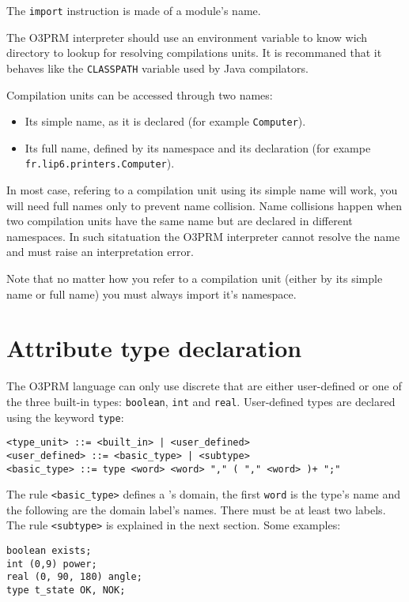 \documentclass[singlespacing,12pt,a4paper]{article}
\begin{document}
The \verb+import+ instruction is made of a module's name.

The O3PRM interpreter should use an environment variable to know wich directory
to lookup for resolving compilations units. It is recommaned that it behaves
like the \verb+CLASSPATH+ variable used by Java compilators.

Compilation units can be accessed through two names:
\begin{itemize}
\item Its simple name, as it is declared (for example \verb+Computer+).
\item Its full name, defined by its namespace and its declaration (for exampe
\verb+fr.lip6.printers.Computer+).
\end{itemize}
In most case, refering to a compilation unit using its simple name will work,
you will need full names only to prevent name collision. Name collisions happen
when two compilation units have the same name but are declared in different
namespaces. In such sitatuation the O3PRM interpreter cannot resolve the name
and must raise an interpretation error.

Note that no matter how you refer to a compilation unit (either by its simple
name or full name) you must always import it's namespace.

\section{Attribute type declaration}

The O3PRM language can only use discrete \rvs{} that are either user-defined or
one of the three built-in types: \verb+boolean+, \verb+int+ and \verb+real+.
User-defined types are declared using the keyword \verb+type+:

\begin{footnotesize}
\begin{verbatim}
<type_unit> ::= <built_in> | <user_defined>
<user_defined> ::= <basic_type> | <subtype>
<basic_type> ::= type <word> <word> "," ( "," <word> )+ ";"
\end{verbatim}
\end{footnotesize}

The rule \verb+<basic_type>+ defines a \rv{}'s domain, the first \verb+word+
is the type's name and the following are the domain label's names. There must
be at least two labels. The rule \verb+<subtype>+ is explained in the
next section. Some examples:

\begin{footnotesize}
\begin{verbatim}
boolean exists;
int (0,9) power;
real (0, 90, 180) angle;
type t_state OK, NOK;
\end{verbatim}
\end{footnotesize}
\end{document}
